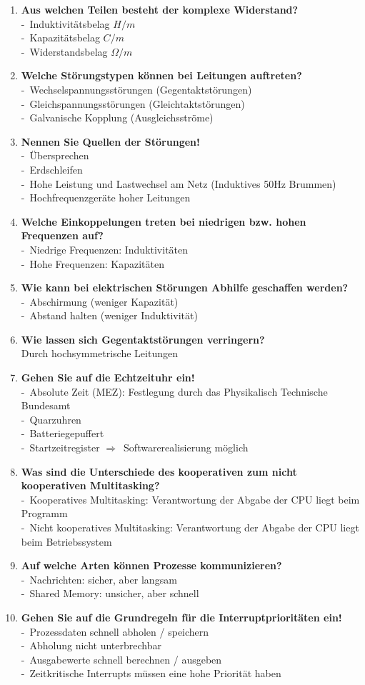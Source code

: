\documentclass[a4paper,12pt]{article}
\newcommand{\questionnopage}[2]{\pagebreak[3]\item {\textbf{#1?}}#2}
\newcommand{\statementnopage}[2]{\pagebreak[3]\item {\textbf{#1!}}#2}
\newcommand{\catchword}[1]{\\-\ #1}
\newcommand{\normaltext}[1]{\\#1}
\newcommand{\resultol}[1]{$\Rightarrow$\ #1}
\begin{document}
\begin{enumerate}
  \questionnopage{Aus welchen Teilen besteht der komplexe Widerstand}
  {
    \catchword{Induktivitätsbelag $H/m$}
    \catchword{Kapazitätsbelag $C/m$}
    \catchword{Widerstandsbelag $\Omega/m$}
  }

  \questionnopage{Welche Störungstypen können bei Leitungen auftreten}
  {
    \catchword{Wechselspannungsstörungen (Gegentaktstörungen)}
    \catchword{Gleichspannungsstörungen (Gleichtaktstörungen)}
    \catchword{Galvanische Kopplung (Ausgleichsströme)}
  }

  \statementnopage{Nennen Sie Quellen der Störungen}
  {
    \catchword{Übersprechen}
    \catchword{Erdschleifen}
    \catchword{Hohe Leistung und Lastwechsel am Netz (Induktives 50Hz Brummen)}
    \catchword{Hochfrequenzgeräte hoher Leitungen}
  }

  \questionnopage{Welche Einkoppelungen treten bei niedrigen bzw. hohen Frequenzen auf}
  {
    \catchword{Niedrige Frequenzen: Induktivitäten}
    \catchword{Hohe Frequenzen: Kapazitäten}
  }

  \questionnopage{Wie kann bei elektrischen Störungen Abhilfe geschaffen werden}
  {
    \catchword{Abschirmung (weniger Kapazität)}
    \catchword{Abstand halten (weniger Induktivität)}
  }

  \questionnopage{Wie lassen sich Gegentaktstörungen verringern}
  {
    \normaltext{Durch hochsymmetrische Leitungen}
  }

  \statementnopage{Gehen Sie auf die Echtzeituhr ein}
  {
    \catchword{Absolute Zeit (MEZ): Festlegung durch das Physikalisch Technische Bundesamt}
    \catchword{Quarzuhren}
    \catchword{Batteriegepuffert}
    \catchword{Startzeitregister \resultol{Softwarerealisierung möglich}}
  }

  \questionnopage{Was sind die Unterschiede des kooperativen zum nicht kooperativen Multitasking}
  {
    \catchword{Kooperatives Multitasking: Verantwortung der Abgabe der CPU liegt beim Programm}
    \catchword{Nicht kooperatives Multitasking: Verantwortung der Abgabe der CPU liegt beim
               Betriebssystem}
  }

  \questionnopage{Auf welche Arten können Prozesse kommunizieren}
  {
    \catchword{Nachrichten: sicher, aber langsam}
    \catchword{Shared Memory: unsicher, aber schnell}
  }

  \statementnopage{Gehen Sie auf die Grundregeln für die Interruptprioritäten ein}
  {
    \catchword{Prozessdaten schnell abholen / speichern}
    \catchword{Abholung nicht unterbrechbar}
    \catchword{Ausgabewerte schnell berechnen / ausgeben}
    \catchword{Zeitkritische Interrupts müssen eine hohe Priorität haben}
  }


\end{enumerate}
\end{document}
